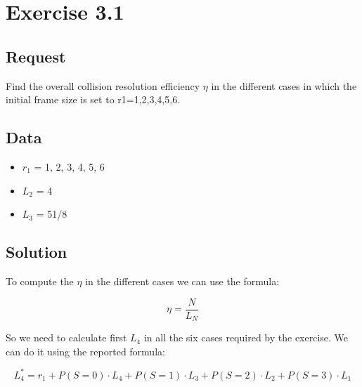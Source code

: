 \section{Exercise 3.1}
\subsection{Request}
Find the overall collision resolution efficiency $\eta$ in the different cases in which the initial frame size is set to r1=1,2,3,4,5,6.
\subsection{Data}
\begin{itemize}
\item $r_1$ = 1, 2, 3, 4, 5, 6
\item $L_2$ = 4
\item $L_3$ = 51/8
\end{itemize}
\subsection{Solution}
To compute the $\eta$ in the different cases we can use the formula:

\begin{equation}
\eta = \frac{N} {L_N}
\end{equation}

So we need to calculate first $L_4$ in all the six cases required by the exercise. We can do it using the reported formula:

\begin{equation}
L_4^* = r_1 + P(S=0) \cdot L_4 + P(S=1) \cdot L_3 + P(S=2) \cdot L_2 + P(S=3) \cdot L_1
\end{equation}

